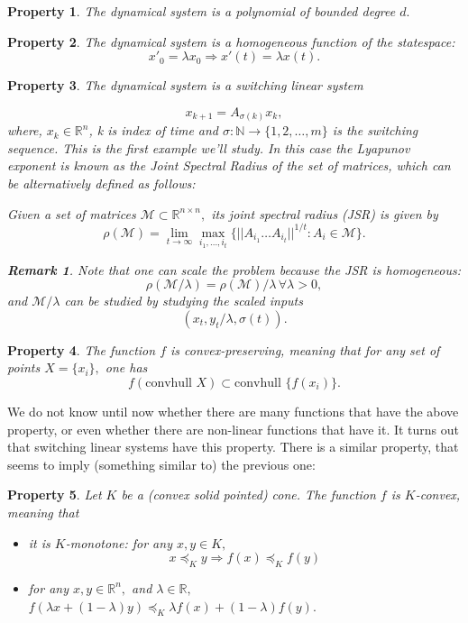 \documentclass[letterpaper, 10 pt, conference]{ieeeconf}  %
\newcommand{\convhull}{\mbox{convhull } }
\newcommand{\R}{\mathbb{R} }
\newcommand{\N}{\mathbb{N} }
\newcommand{\conv}{\convhull }
\newcommand{\re}{\mathbb{R}}
\newcommand{\cM}{\mathcal{M}}
\newtheorem{remark}{Remark}[section]
\newtheorem{property}{Property}[section]
\newenvironment{definition}[1][Definition]{\begin{trivlist}
\item[\hskip \labelsep {\bfseries #1}]}{\end{trivlist}}
\begin{document}
\begin{property}\label{property:poly}
The dynamical system is a polynomial of bounded degree $d.$
\end{property}
\begin{property}\label{property:homogeneity}
The dynamical system is a homogeneous function of the statespace: $$x'_0=\lambda x_0 \Rightarrow x'(t)=\lambda x(t). $$
\end{property}
\begin{property}
The dynamical system is a switching linear system

\begin{equation}\label{switchedSystem}x_{k+1} = A_{\sigma(k)}x_k,
\end{equation}
where, $x_k \in \R^n$, k is index of time and $\sigma: \N \to \{1,2, \ldots, m\}$ is the switching sequence.  This is the first example we'll study.
In this case the Lyapunov exponent is known as the Joint Spectral Radius of the set of matrices, which can be alternatively defined as follows:
\begin{definition}  \cite{jungers_lncis} Given a set of matrices $\cM \subset \re^{n\times n},$ its \emph{joint spectral radius} (JSR) is given by
$$\rho(\cM) =\lim_{t\rightarrow \infty} \max_{i_1,\dots, i_t}\{||A_{i_1} \dots A_{i_t}||^{1/t}: A_i\in\cM\}. $$
\end{definition}
\begin{remark}
 Note that one can scale the problem because the JSR is homogeneous:
$$\rho(\cM/\lambda)=\rho(\cM)/\lambda\, \forall \lambda>0, $$ and $\cM/\lambda$ can be studied by studying the scaled inputs $$(x_t, y_t/\lambda,\sigma(t)).$$
\end{remark}
\end{property}
\begin{property}\label{property:convpres}
 The function $f$ is \emph{convex-preserving,} meaning that for any set of points $X=\{x_i\},$ one has
$$ f(\conv{X})\subset \conv\{f(x_i)\}. $$
\end{property}
We do not know until now whether there are many functions that have the above property, or even whether there are non-linear functions that have it. It turns out that switching linear systems have this property. There is a similar property, that seems to imply (something similar to) the previous one:
\begin{property}\label{property:kconvexity} \cite{VaB:96}Let $K$ be a (convex solid pointed) cone. The function $f$ is \emph{$K$-convex,}  meaning that \begin{itemize} \item it is $K$-monotone: for any $x,y\in K,$ $$x\preceq_K y \Rightarrow f( x )\preceq_K  f(y)$$ \item for any $x,y\in \re^n,$ and $\lambda \in \re,$ $f(\lambda x + (1-\lambda)y)\preceq_K \lambda f(x) + (1-\lambda)f(y).$ \end{itemize}
\end{property}
\end{document}

